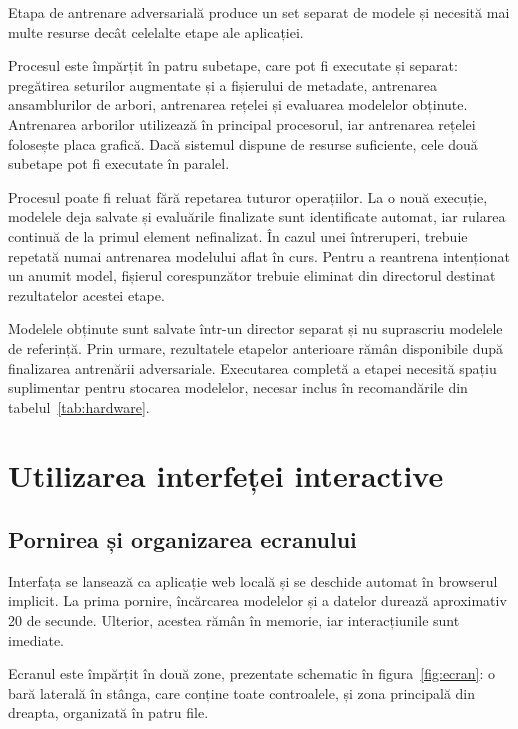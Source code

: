 Etapa de antrenare adversarială produce un set separat de modele și necesită mai multe resurse decât celelalte etape ale aplicației.

Procesul este împărțit în patru subetape, care pot fi executate și separat: pregătirea seturilor augmentate și a fișierului de metadate, antrenarea ansamblurilor de arbori, antrenarea rețelei și evaluarea modelelor obținute. Antrenarea arborilor utilizează în principal procesorul, iar antrenarea rețelei folosește placa grafică. Dacă sistemul dispune de resurse suficiente, cele două subetape pot fi executate în paralel.

Procesul poate fi reluat fără repetarea tuturor operațiilor. La o nouă execuție, modelele deja salvate și evaluările finalizate sunt identificate automat, iar rularea continuă de la primul element nefinalizat. În cazul unei întreruperi, trebuie repetată numai antrenarea modelului aflat în curs. Pentru a reantrena intenționat un anumit model, fișierul corespunzător trebuie eliminat din directorul destinat rezultatelor acestei etape.

Modelele obținute sunt salvate într-un director separat și nu suprascriu modelele de referință. Prin urmare, rezultatele etapelor anterioare rămân disponibile după finalizarea antrenării adversariale. Executarea completă a etapei necesită spațiu suplimentar pentru stocarea modelelor, necesar inclus în recomandările din tabelul~\ref{tab:hardware}.

\section{Utilizarea interfeței interactive}\label{sec:utilizare}

\subsection{Pornirea și organizarea ecranului}\label{subsec:pornire}

Interfața se lansează ca aplicație web locală și se deschide automat în browserul implicit. La prima pornire, încărcarea modelelor și a datelor durează aproximativ 20 de secunde. Ulterior, acestea rămân în memorie, iar interacțiunile sunt imediate.

Ecranul este împărțit în două zone, prezentate schematic în figura~\ref{fig:ecran}: o bară laterală în stânga, care conține toate controalele, și zona principală din dreapta, organizată în patru file.

